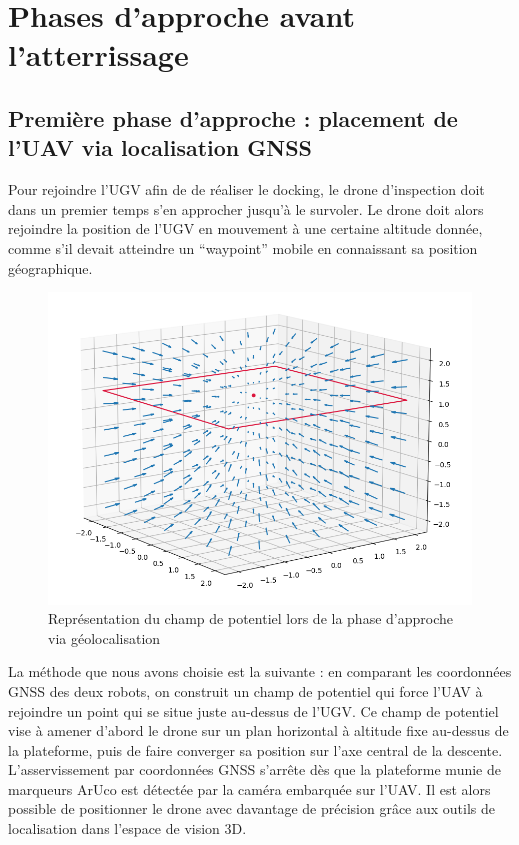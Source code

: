 \section{Phases d’approche avant l’atterrissage}

\subsection{Première phase d’approche : placement de l’UAV via localisation GNSS}

Pour rejoindre l’UGV afin de de réaliser le docking, le drone d’inspection doit dans un premier temps s’en approcher jusqu’à le survoler. Le drone doit alors rejoindre la position de l’UGV en mouvement à une certaine altitude donnée, comme s'il devait atteindre un “waypoint” mobile en connaissant sa position géographique.

\begin{figure}[H]
    \centering\includegraphics[width=150mm]{images/phases_approche/potent_phase_1.png}
    \caption{Représentation du champ de potentiel lors de la phase d'approche via géolocalisation \cite{quiver}}
\end{figure}

La méthode que nous avons choisie est la suivante : en comparant les coordonnées GNSS des deux robots, on construit un champ de potentiel qui force l’UAV à rejoindre un point qui se situe juste au-dessus de l’UGV. Ce champ de potentiel vise à amener d’abord le drone sur un plan horizontal à altitude fixe au-dessus de la plateforme, puis de faire converger sa position sur l’axe central de la descente.
L'asservissement par coordonnées GNSS s’arrête dès que la plateforme munie de marqueurs ArUco est détectée par la caméra embarquée sur l’UAV. Il est alors possible de positionner le drone avec davantage de précision grâce aux outils de localisation dans l’espace de vision 3D.

